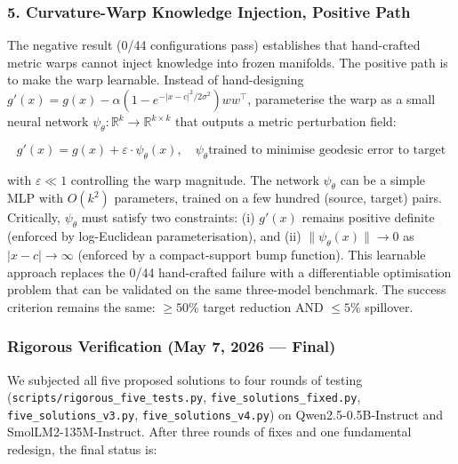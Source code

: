 \documentclass[11pt]{article}
\begin{document}
\subsubsection{5. Curvature-Warp Knowledge Injection, Positive Path}

The negative result (0/44 configurations pass) establishes that
hand-crafted metric warps cannot inject knowledge into frozen manifolds. The
positive path is to make the warp learnable. Instead of
hand-designing $g'(x) = g(x) - \alpha(1-e^{-|x-c|^2/2\sigma^2})ww^\top$,
parameterise the warp as a small neural network $\psi_\theta: \mathbb{R}^k
\to \mathbb{R}^{k \times k}$ that outputs a metric perturbation field:

\begin{equation}
g'(x) = g(x) + \varepsilon \cdot \psi_\theta(x), \quad \psi_\theta \text{
trained to minimise geodesic error to target}
\end{equation}

with $\varepsilon \ll 1$ controlling the warp magnitude. The network
$\psi_\theta$ can be a simple MLP with $O(k^2)$ parameters, trained on a few
hundred (source, target) pairs. Critically, $\psi_\theta$ must satisfy two
constraints: (i) $g'(x)$ remains positive definite (enforced by
log-Euclidean parameterisation), and (ii) $\|\psi_\theta(x)\| \to 0$ as
$|x-c| \to \infty$ (enforced by a compact-support bump function). This
learnable approach replaces the 0/44 hand-crafted failure with a
differentiable optimisation problem that can be validated on the same
three-model benchmark. The success criterion remains the same: $\ge 50\%$
target reduction AND $\le 5\%$ spillover.

\subsubsection{Rigorous Verification (May 7, 2026 --- Final)}

We subjected all five proposed solutions to four rounds of testing
(\texttt{scripts/rigorous\_five\_tests.py},
\texttt{five\_solutions\_fixed.py},
\texttt{five\_solutions\_v3.py},
\texttt{five\_solutions\_v4.py}) on Qwen2.5-0.5B-Instruct and
SmolLM2-135M-Instruct. After three rounds of fixes and one fundamental
redesign, the final status is:
\end{document}
